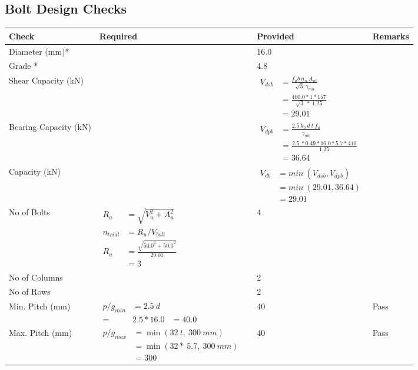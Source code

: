 \documentclass{article}%
\begin{document}
\subsection{Bolt Design Checks}%
\label{subsec:BoltDesignChecks}%
\renewcommand{\arraystretch}{1.2}%
\begin{longtable}{|p{4cm}|p{5cm}|p{5.5cm}|p{1.5cm}|}%
\hline%
\rowcolor{OsdagGreen}%
Check&Required&Provided&Remarks\\%
\hline%
\endhead%
\hline%
Diameter (mm)*&&16.0&\\%
\hline%
Grade *&&4.8&\\%
\hline%
Shear Capacity (kN)&&$\begin{aligned}V_{dsb} &= \frac{f_ub ~n_n~ A_{nb}}{\sqrt{3} ~\gamma_{mb}}\\ &= \frac{400.0*1*157}{\sqrt{3}~*~1.25}\\ &= 29.01\end{aligned}$&\\%
\hline%
Bearing Capacity (kN)&&$\begin{aligned}V_{dpb} &= \frac{2.5~ k_b~ d~ t~ f_u}{\gamma_{mb}}\\ &= \frac{2.5~*0.49*16.0*5.7*410}{1.25}\\ &=36.64\end{aligned}$&\\%
\hline%
Capacity (kN)&&$\begin{aligned}V_{db} &= min~ (V_{dsb}, V_{dpb})\\ &= min~ (29.01,36.64)\\ &=29.01\end{aligned}$&\\%
\hline%
No of Bolts&$\begin{aligned}R_{u} &= \sqrt{V_u^2+A_u^2}\\ n_{trial} &= R_u/ V_{bolt}\\ R_{u} &= \frac{\sqrt{50.0^2+50.0^2}}{29.01}\\ &=3\end{aligned}$&4&\\%
\hline%
No of Columns&&2&\\%
\hline%
No of Rows&&2&\\%
\hline%
Min. Pitch (mm)&$\begin{aligned}p/g_{min}&= 2.5 ~ d&\\ =&2.5*16.0&=40.0\end{aligned}$&40&Pass\\%
\hline%
Max. Pitch (mm)&$\begin{aligned}p/g_{max} &=\min(32~t,~300~mm)&\\ &=\min(32 *~5.7,~ 300 ~mm)\\&=300\end{aligned}$&40&Pass\\%

\end{longtable}
\end{document}
